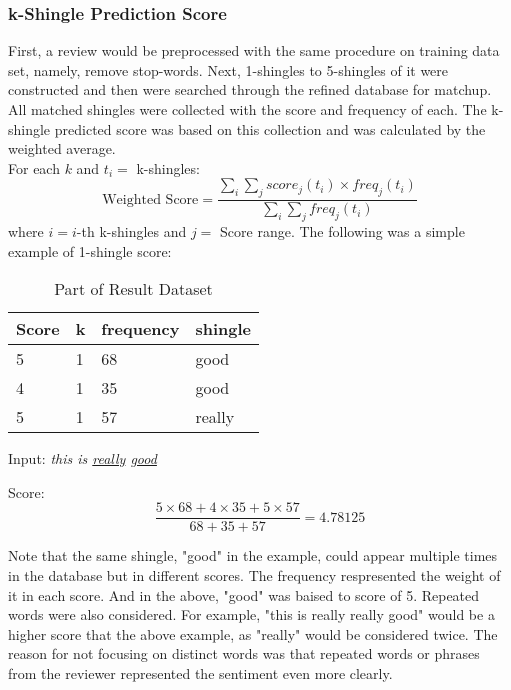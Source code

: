 \subsubsection{k-Shingle Prediction Score}
First, a review would be preprocessed with the same procedure on training data set, namely, remove stop-words. Next, 1-shingles to 5-shingles of it were constructed and then were searched through the refined database for matchup.
All matched shingles were collected with the score and frequency of each.
The k-shingle predicted score was based on this collection and was calculated by the weighted average.\\
For each \(k\) and \(t_i =\) k-shingles:
\begin{displaymath}
\mbox{Weighted Score} = \frac{\sum_i\sum_j score_j(t_i) \times freq_j(t_i)}{\sum_i\sum_j freq_j(t_i)}
\end{displaymath}
where \(i= i\)-th k-shingles and \(j=\) Score range.
The following was a simple example of 1-shingle score:

\begin{table}[H]
	\caption{Part of Result Dataset}
	\label{tab:commands}
	\begin{tabular}{llll}
	\toprule
	Score & k & frequency & shingle \\
	\midrule
	5 & 1 & 68 & good \\
	4 & 1 & 35 & good \\
	5 & 1 & 57 & really \\
	\bottomrule
	\end{tabular}
\end{table}

Input: \textit{this is \underline{really} \underline{good}}

Score:
\begin{displaymath}
\frac{5 \times 68 + 4 \times 35 + 5 \times 57}{68 + 35 + 57} = 4.78125
\end{displaymath}

Note that the same shingle, "good" in the example, could appear multiple times in the database but in different scores.
The frequency respresented the weight of it in each score. And in the above, "good" was baised to score of 5.
Repeated words were also considered. For example, "this is really really good" would be a higher score that the above example, as "really" would be considered twice.
The reason for not focusing on distinct words was that repeated words or phrases from the reviewer represented the sentiment even more clearly.

